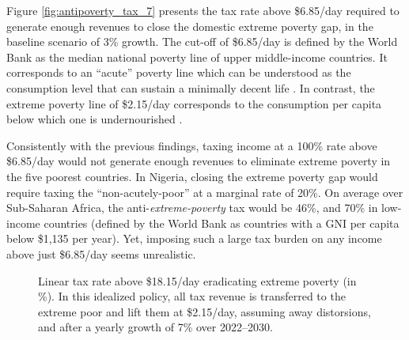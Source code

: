 Figure \ref{fig:antipoverty_tax_7} presents the tax rate above \$6.85/day required to generate enough revenues to close the domestic extreme poverty gap, in the baseline scenario of 3\% growth. %
The cut-off of \$6.85/day is defined by the World Bank as the median national poverty line of upper middle-income countries. It corresponds to an ``acute'' poverty line which can be understood as the consumption level that can sustain a minimally decent life \citep{hickel_is_2019,kikstra_decent_2021}. In contrast, the extreme poverty line of \$2.15/day corresponds to the consumption per capita below which one is undernourished \citep{allen_absolute_2017}. 

Consistently with the previous findings, taxing income at a 100\% rate above \$6.85/day would not generate enough revenues to eliminate extreme poverty in the five poorest countries. In Nigeria, closing the extreme poverty gap would require taxing the ``non-acutely-poor'' at a marginal rate of 20\%. 
On average over Sub-Saharan Africa, the anti-\textit{extreme-poverty} tax would be 46\%, and 70\% in low-income countries (defined by the World Bank as countries with a GNI per capita below \$1,135 per year). Yet, imposing such a large tax burden on any income above just \$6.85/day seems unrealistic. 

\begin{figure}[b!]
  \caption[Anti-\textit{extreme-poverty} tax above \$18.15/day in 2030 after 3\% growth.]{Linear tax rate above \$18.15/day eradicating extreme poverty (in \%). In this idealized policy, all tax revenue is transferred to the extreme poor and lift them at \$2.15/day, assuming away distorsions, and after a yearly growth of 7\% over 2022--2030.
  }\label{fig:antipoverty_tax_18}
\end{figure}

